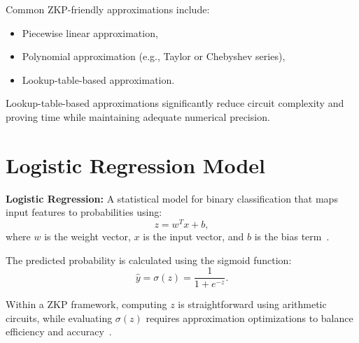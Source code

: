 Common ZKP-friendly approximations include:
\begin{itemize}
    \item Piecewise linear approximation,
    \item Polynomial approximation (e.g., Taylor or Chebyshev series),
    \item Lookup-table-based approximation.
\end{itemize}

\begin{remark}
Lookup-table-based approximations significantly reduce circuit complexity and proving time while maintaining adequate numerical precision.
\end{remark}

\section{Logistic Regression Model}

\begin{definition}\label{def:logreg}
\textbf{Logistic Regression:} A statistical model for binary classification that maps input features to probabilities using:
\begin{equation}
    z = w^T x + b,
\end{equation}
where $w$ is the weight vector, $x$ is the input vector, and $b$ is the bias term~\cite{hosmer2013applied}.
\end{definition}

The predicted probability is calculated using the sigmoid function:
\begin{equation}\label{eq:prediction}
\widehat{y} = \sigma(z) = \frac{1}{1 + e^{-z}}.
\end{equation}

\begin{remark}
Within a ZKP framework, computing $z$ is straightforward using arithmetic circuits, while evaluating $\sigma(z)$ requires approximation optimizations to balance efficiency and accuracy~\cite{cryptoeprint:2023/1174}.
\end{remark}

\clearpage
